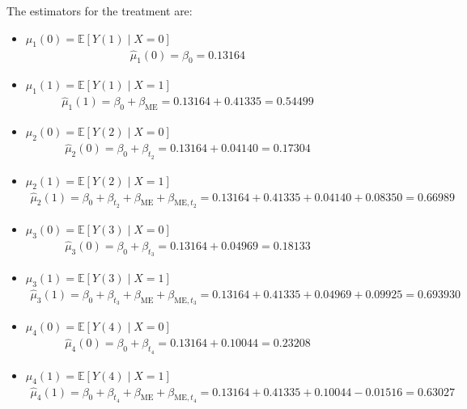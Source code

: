 \documentclass{article}
\begin{document}
\begin{figure}[H]
The estimators for the treatment are:
\begin{itemize}
  \item $\mu_1(0) = \mathbb{E}[Y(1) \mid X = 0]$
  \begin{align*}
    \hat{\mu}_1(0) = \beta_{0} = 0.13164
  \end{align*}
  \item $\mu_1(1) = \mathbb{E}[Y(1) \mid X = 1]$
  \begin{align*}
    \hat{\mu}_1(1) = \beta_{0} + \beta_{\text{ME}} = 0.13164 + 0.41335 = 0.54499
  \end{align*}
  \item $\mu_2(0) = \mathbb{E}[Y(2) \mid X = 0]$
  \begin{align*}
    \hat{\mu}_2(0) = \beta_{0} + \beta_{t_2} = 0.13164 + 0.04140 = 0.17304
  \end{align*}
  \item $\mu_2(1) = \mathbb{E}[Y(2) \mid X = 1]$
  \begin{align*}
    \hat{\mu}_2(1) = \beta_{0} + \beta_{t_2} + \beta_{\text{ME}} + \beta_{\text{ME}, t_2} = 0.13164 + 0.41335 + 0.04140 + 0.08350 = 0.66989
  \end{align*}
  \item $\mu_3(0) = \mathbb{E}[Y(3) \mid X = 0]$
  \begin{align*}
    \hat{\mu}_3(0) = \beta_{0} + \beta_{t_3} = 0.13164 + 0.04969 = 0.18133
  \end{align*}
  \item $\mu_3(1) = \mathbb{E}[Y(3) \mid X = 1]$
  \begin{align*}
    \hat{\mu}_3(1) = \beta_{0} + \beta_{t_3} + \beta_{\text{ME}} + \beta_{\text{ME}, t_3} = 0.13164 + 0.41335 + 0.04969 + 0.09925 = 0.693930
  \end{align*}
  \item $\mu_4(0) = \mathbb{E}[Y(4) \mid X = 0]$
  \begin{align*}
    \hat{\mu}_4(0) = \beta_{0} + \beta_{t_4} = 0.13164 + 0.10044 = 0.23208
  \end{align*}
  \item $\mu_4(1) = \mathbb{E}[Y(4) \mid X = 1]$
  \begin{align*}
    \hat{\mu}_4(1) = \beta_{0} + \beta_{t_4} + \beta_{\text{ME}} + \beta_{\text{ME}, t_4} = 0.13164 + 0.41335 + 0.10044 - 0.01516 = 0.63027
  \end{align*}
\end{itemize}
\end{figure}
\end{document}
